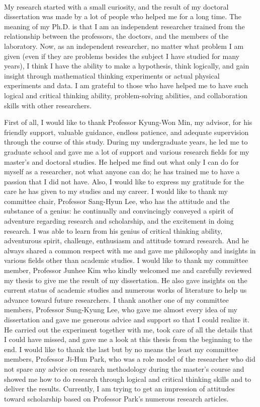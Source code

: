 \begin{center}
\\
\end{center}

My research started with a small curiosity, and the result of my doctoral dissertation was made by a lot of people who helped me for a long time. The meaning of my Ph.D. is that I am an independent researcher trained from the relationship between the professors, the doctors, and the members of the laboratory. Now, as an independent researcher, no matter what problem I am given (even if they are problems besides the subject I have studied for many years), I think I have the ability to make a hypothesis, think logically, and gain insight through mathematical thinking experiments or actual physical experiments and data. I am grateful to those who have helped me to have such logical and critical thinking ability, problem-solving abilities, and collaboration skills with other researchers. 

First of all, I would like to thank Professor Kyung-Won Min, my advisor, for his friendly support, valuable guidance, endless patience, and adequate supervision through the course of this study. During my undergraduate years, he led me to graduate school and gave me a lot of support and various research fields for my master's and doctoral studies. He helped me find out what only I can do for myself as a researcher, not what anyone can do; he has trained me to have a passion that I did not have. Also, I would like to express my gratitude for the care he has given to my studies and my career. I would like to thank my committee chair, Professor Sang-Hyun Lee, who has the attitude and the substance of a genius: he continually and convincingly conveyed a spirit of adventure regarding research and scholarship, and the excitement in doing research. I was able to learn from his genius of critical thinking ability, adventurous spirit, challenge, enthusiasm and attitude toward research. And he always shared a common respect with me and gave me philosophy and insights in various fields other than academic studies. I would like to thank my committee member, Professor Junhee Kim who kindly welcomed me and carefully reviewed my thesis to give me the result of my dissertation. He also gave insights on the current status of academic studies and numerous works of literature to help us advance toward future researchers. I thank another one of my committee members, Professor Sung-Kyung Lee, who gave me almost every idea of my dissertation and gave me generous advice and support so that I could realize it. He carried out the experiment together with me, took care of all the details that I could have missed, and gave me a look at this thesis from the beginning to the end. I would like to thank the last but by no means the least my committee members, Professor Ji-Hun Park, who was a role model of the researcher who did not spare any advice on research methodology during the master's course and showed me how to do research through logical and critical thinking skills and to deliver the results. Currently, I am trying to get an impression of attitudes toward scholarship based on Professor Park's numerous research articles. 

